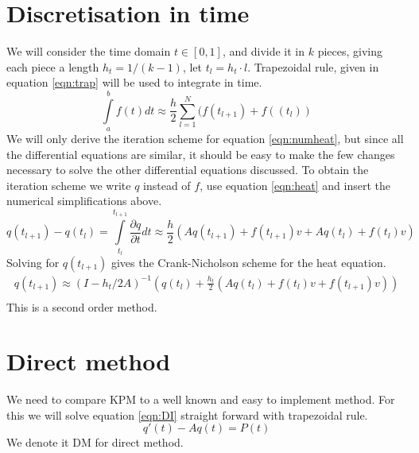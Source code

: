 \section{Discretisation in time} \label{sec:time}
We will consider the time domain $t \in [0,1] $, and divide it in $k$ pieces, giving each piece a length $h_t = 1/(k-1)$, let $t_l = h_t\cdot l$.
Trapezoidal rule\cite{trap}, given in equation \eqref{eqn:trap} will be used to integrate in time. 
\begin{equation} \label{eqn:trap}
\int \limits_a^b f(t) dt \approx \frac{h}{2} \sum \limits_{l = 1}^N(f(t_{l+1})+f((t_l))
\end{equation}
We will only derive the iteration scheme for equation \eqref{eqn:numheat}, but since all the differential equations are similar, it should be easy to make the few changes necessary to solve the other differential equations discussed.
To obtain the iteration scheme we write $q$ instead of $f$, use equation \eqref{eqn:heat} and insert the numerical simplifications above.
\begin{equation}
q(t_{l+1}) - q(t_l) = \int \limits_{t_l}^{t_{l+1}} \frac{\partial q}{\partial t} dt \approx \frac{h}{2}(A q(t_{l+1})+f(t_{l+1})v +A q(t_l)+f(t_l) v) 
\end{equation}
Solving for $q(t_{l+1})$ gives the Crank-Nicholson scheme for the heat equation.
\begin{equation} \label{eqn:trapscheme}
\begin{aligned}
q(t_{l+1}) \approx (I-h_t/2 A)^{-1}(q(t_l) + \frac{h_t}{2}( A q(t_{l}) + f(t_l)v+f(t_{l+1})v))\\
\end{aligned}
\end{equation} 
This is a second order method.
\section{Direct method} \label{sec:DM}
We need to compare KPM to a well known and easy to implement method. For this we will solve equation \eqref{eqn:DI} straight forward with trapezoidal rule.
\begin{equation} \label{eqn:DI}
q'(t) -A q(t) = P(t)
\end{equation}
We denote it DM for direct method.
\newpage
